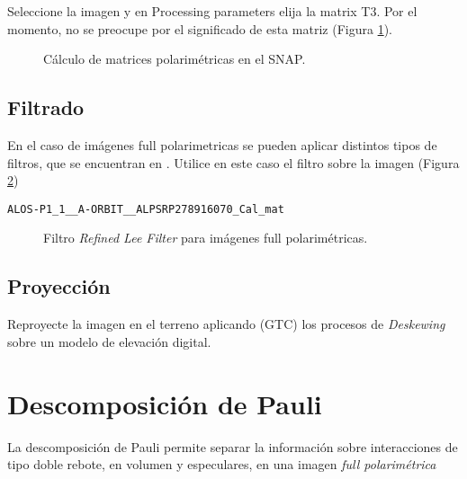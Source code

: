 Seleccione la imagen  y en Processing parameters elija la matrix T3. Por el momento, no se preocupe por el significado de esta matriz (Figura \ref{fig:t3}).

\begin{figure}[h!]
    \centering
    \hspace{1cm}
    \caption{Cálculo de matrices polarimétricas en el SNAP.}
    \label{fig:t3}
\end{figure}

\subsection{Filtrado}

En el caso de imágenes full polarimetricas se pueden aplicar distintos tipos de filtros, que se encuentran en . Utilice en este caso el filtro  sobre la imagen (Figura \ref{fig:plee})
\begin{center} \texttt{ALOS-P1\_1\_\_A-ORBIT\_\_ALPSRP278916070\_Cal\_mat}\end{center}

\begin{figure}[h!]
    \centering
    \hspace{1cm}
    \caption{Filtro \emph{Refined Lee Filter} para imágenes full polarimétricas.}
    \label{fig:plee}
\end{figure}

\subsection{Proyección}

Reproyecte la imagen en el terreno aplicando (GTC) los procesos de \emph{Deskewing} sobre un modelo de elevación digital.

\section{Descomposición de Pauli}

La descomposición de Pauli permite separar la información sobre interacciones de tipo doble rebote, en volumen y especulares, en una imagen \emph{full polarimétrica}

